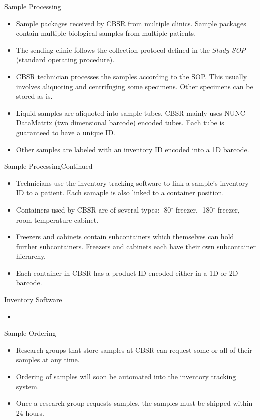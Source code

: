 \documentclass{beamer}
\begin{document}
\begin{frame}{Sample Processing}{}
  \begin{itemize}
    \item Sample packages received by CBSR from multiple clinics. Sample
      packages contain multiple biological samples from multiple patients.
    \item The sending clinic follows the collection protocol defined in the
      \emph{Study SOP} (standard operating procedure).
    \item CBSR technician processes the samples according to the SOP. This
      usually involves aliquoting and centrifuging some specimens. Other
      specimens can be stored as is.
    \item Liquid samples are aliquoted into sample tubes. CBSR mainly uses NUNC
      DataMatrix (two dimensional barcode) encoded tubes. Each tube is
      guaranteed to have a unique ID.
    \item Other samples are labeled with an inventory ID encoded into a 1D
      barcode.
  \end{itemize}
\end{frame}

\begin{frame}{Sample Processing}{Continued}
  \begin{itemize}
    \item Technicians use the inventory tracking software to link a sample's
      inventory ID to a patient. Each samaple is also linked to a container
      position.
    \item Containers used by CBSR are of several types: -80$^\circ$ freezer,
      -180$^\circ$ freezer, room temperature cabinet.
    \item Freezers and cabinets contain subcontainers which themselves can hold
      further subcontainers. Freezers and cabinets each have their own
      subcontainer hierarchy.
    \item Each container in CBSR has a product ID encoded either in a 1D or 2D
      barcode.
  \end{itemize}
\end{frame}

\begin{frame}{Inventory Software}
  \begin{itemize}
    \item
  \end{itemize}
\end{frame}

\begin{frame}{Sample Ordering}
  \begin{itemize}
    \item Research groups that store samples at CBSR can request some or all of
      their samples at any time.
    \item Ordering of samples will soon be automated into the inventory
      tracking system.
    \item Once a research group requests samples, the samples must be shipped
      within 24 hours.
  \end{itemize}
\end{frame}
\end{document}
